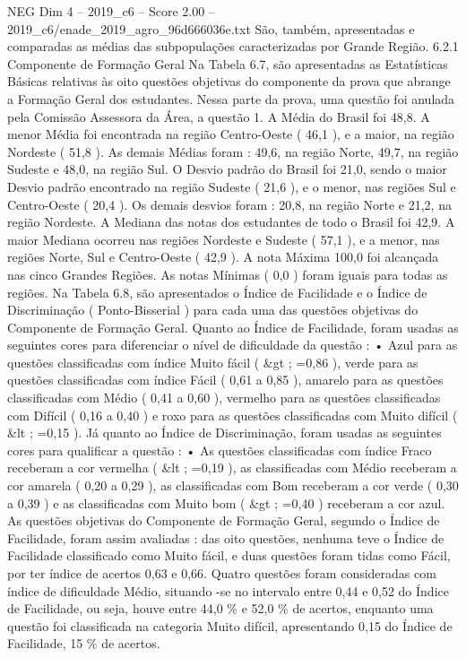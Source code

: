 \begin{textsample}{NEG Dim 4 – 2019\_c6 – Score 2.00 – 2019\_c6/enade\_2019\_agro\_96d666036e.txt}
São, também, apresentadas e comparadas as médias das subpopulações caracterizadas por Grande Região. 6.2.1 Componente de Formação Geral Na Tabela 6.7, são apresentadas as Estatísticas Básicas relativas às oito questões objetivas do componente da prova que abrange a Formação Geral dos estudantes.
Nessa parte da prova, uma questão foi anulada pela Comissão Assessora da Área, a questão 1.
A Média do Brasil foi 48,8.
A menor Média foi encontrada na região Centro-Oeste ( 46,1 ), e a maior, na região Nordeste ( 51,8 ).
As demais Médias foram : 49,6, na região Norte, 49,7, na região Sudeste e 48,0, na região Sul.
O Desvio padrão do Brasil foi 21,0, sendo o maior Desvio padrão encontrado na região Sudeste ( 21,6 ), e o menor, nas regiões Sul e Centro-Oeste ( 20,4 ).
Os demais desvios foram : 20,8, na região Norte e 21,2, na região Nordeste.
A Mediana das notas dos estudantes de todo o Brasil foi 42,9.
A maior Mediana ocorreu nas regiões Nordeste e Sudeste ( 57,1 ), e a menor, nas regiões Norte, Sul e Centro-Oeste ( 42,9 ).
A nota Máxima 100,0 foi alcançada nas cinco Grandes Regiões.
As notas Mínimas ( 0,0 ) foram iguais para todas as regiões.
Na Tabela 6.8, são apresentados o Índice de Facilidade e o Índice de Discriminação ( Ponto-Bisserial ) para cada uma das questões objetivas do Componente de Formação Geral.
Quanto ao Índice de Facilidade, foram usadas as seguintes cores para diferenciar o nível de dificuldade da questão : • Azul para as questões classificadas com índice Muito fácil ( \&gt ; =0,86 ), verde para as questões classificadas com índice Fácil ( 0,61 a 0,85 ), amarelo para as questões classificadas com Médio ( 0,41 a 0,60 ), vermelho para as questões classificadas com Difícil ( 0,16 a 0,40 ) e roxo para as questões classificadas com Muito difícil ( \&lt ; =0,15 ).
Já quanto ao Índice de Discriminação, foram usadas as seguintes cores para qualificar a questão : • As questões classificadas com índice Fraco receberam a cor vermelha ( \&lt ; =0,19 ), as classificadas com Médio receberam a cor amarela ( 0,20 a 0,29 ), as classificadas com Bom receberam a cor verde ( 0,30 a 0,39 ) e as classificadas com Muito bom ( \&gt ; =0,40 ) receberam a cor azul.
As questões objetivas do Componente de Formação Geral, segundo o Índice de Facilidade, foram assim avaliadas : das oito questões, nenhuma teve o Índice de Facilidade classificado como Muito fácil, e duas questões foram tidas como Fácil, por ter índice de acertos 0,63 e 0,66.
Quatro questões foram consideradas com índice de dificuldade Médio, situando -se no intervalo entre 0,44 e 0,52 do Índice de Facilidade, ou seja, houve entre 44,0 \% e 52,0 \% de acertos, enquanto uma questão foi classificada na categoria Muito difícil, apresentando 0,15 do Índice de Facilidade, 15 \% de acertos.

\end{textsample}
